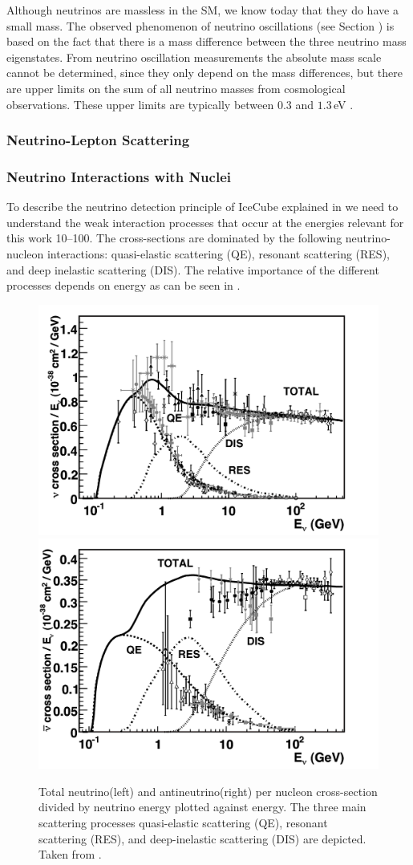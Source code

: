 Although neutrinos are massless in the SM, we know today that they do have a small mass.
The observed phenomenon of neutrino oscillations (see Section ) is based on the fact that there is a mass difference between the three neutrino mass eigenstates.
From neutrino oscillation measurements the absolute mass scale cannot be determined, since they only depend on the mass differences, but there are upper limits on the sum of all neutrino masses from cosmological observations.
These upper limits are typically between $0.3$ and $1.3$\,eV .

\subsubsection{Neutrino-Lepton Scattering}

\subsubsection{Neutrino Interactions with Nuclei}

To describe the neutrino detection principle of IceCube explained in  we need to understand the weak interaction processes that occur at the energies relevant for this work \SIrange[range-phrase=-]{10}{100}{\gev}.
The cross-sections are dominated by the following neutrino-nucleon interactions: quasi-elastic scattering (QE), resonant scattering (RES), and deep inelastic scattering (DIS).
The relative importance of the different processes depends on energy as can be seen in .

\begin{figure}[ht]
	\centering
    \includegraphics[width=0.495\linewidth]{figures/neutrinos_properties/cc_inclusive_nu.pdf}
    \includegraphics[width=0.495\linewidth]{figures/neutrinos_properties/cc_inclusive_nubar.pdf}
	\caption[Total inclusive neutrino-nucleon cross-sections]{Total neutrino(left) and antineutrino(right) per nucleon cross-section divided by neutrino energy plotted against energy.
    The three main scattering processes quasi-elastic scattering (QE), resonant scattering (RES), and deep-inelastic scattering (DIS) are depicted. Taken from \cite{Formaggio_Cross_Sections}.}
\end{figure}

